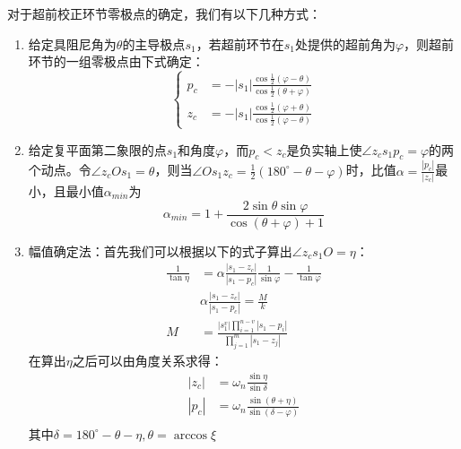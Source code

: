 对于超前校正环节零极点的确定，我们有以下几种方式：
\begin{enumerate}
    \item 给定具阻尼角为$\theta$的主导极点$s_1$，若超前环节在$s_1$处提供的超前角为$\varphi$，则超前环节的一组零极点由下式确定：
    \begin{equation*}
        \begin{cases}
            p_c &= -\left\lvert s_1 \right\rvert \frac{\cos \frac{1}{2}(\varphi - \theta)}{\cos \frac{1}{2} (\theta + \varphi)}  \\
            z_c &= -\left\lvert s_1 \right\rvert \frac{\cos \frac{1}{2}(\varphi + \theta)}{\cos \frac{1}{2} (\varphi - \theta)}
        \end{cases}
    \end{equation*}
    \item 给定复平面第二象限的点$s_1$和角度$\varphi$，而$p_c < z_c$是负实轴上使$\angle z_c s_1 p_c = \varphi$的两个动点。令$\angle z_c O s_1 = \theta$，则当$\angle O s_1 z_c = \frac{1}{2} (180^\circ - \theta -\varphi)$时，比值$\alpha = \frac{\left\lvert p_c \right\rvert }{\left\lvert z_c \right\rvert }$最小，且最小值$\alpha_{min}$为
    \begin{equation*}
        \alpha_{min} = 1 + \frac{2 \sin \theta \sin \varphi}{\cos (\theta + \varphi) + 1}
    \end{equation*}
    \item 幅值确定法：首先我们可以根据以下的式子算出$\angle z_c s_1 O = \eta $：
    \begin{equation*}
        \begin{split}
            \frac{1}{\tan \eta} &= \alpha \frac{\left\lvert s_1 - z_c \right\rvert}{\left\lvert s_1 - p_c \right\rvert } \frac{1}{\sin \varphi} - \frac{1}{\tan \varphi} \\
            &\alpha \frac{\left\lvert s_1 - z_c \right\rvert}{\left\lvert s_1 - p_c \right\rvert } = \frac{M}{k} \\
            M &= \frac{\left\lvert s_1^v \right\rvert \prod_{i=1}^{n-v}\left\lvert s_1 - p_i \right\rvert}{\prod_{j=1}^{m}\left\lvert s_1 - z_j \right\rvert}
        \end{split}
    \end{equation*}
    在算出$\eta$之后可以由角度关系求得：
    \begin{equation*}
        \begin{split}
            \left\lvert z_c \right\rvert &= \omega_n \frac{\sin \eta}{\sin \delta} \\
            \left\lvert p_c \right\rvert &= \omega_n \frac{\sin (\theta + \eta)}{\sin (\delta - \varphi)} \\
        \end{split}
    \end{equation*}
    其中$\delta = 180^\circ - \theta - \eta,\theta = \arccos \xi$
\end{enumerate}


